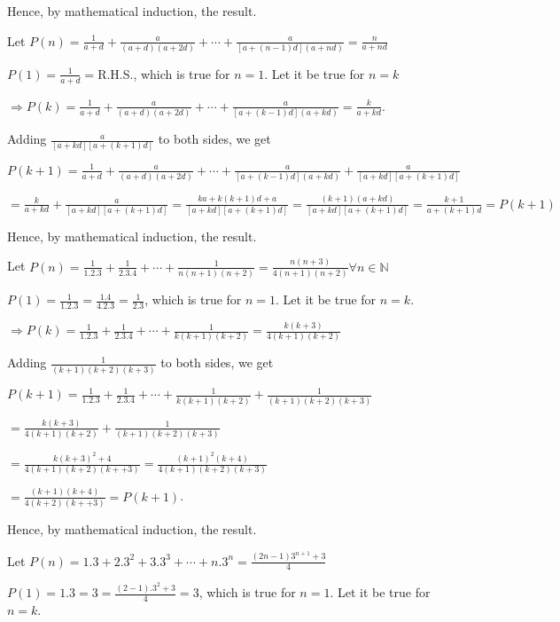   Hence, by mathematical induction, the result.
\item Let $P(n) = \frac{1}{a + d} + \frac{a}{(a + d)(a + 2d)} + \cdots + \frac{a}{[a + (n - 1)d](a + nd)} =
  \frac{n}{a + nd}$

  $P(1) = \frac{1}{a + d} = $R.H.S., which is true for $n = 1$. Let it be true for $n = k$

  $\Rightarrow P(k) = \frac{1}{a + d} + \frac{a}{(a + d)(a + 2d)} + \cdots + \frac{a}{[a + (k - 1)d](a +
    kd)} = \frac{k}{a + kd}$.

  Adding $\frac{a}{[a + kd][a + (k + 1)d]}$ to both sides, we get

  $P(k + 1) = \frac{1}{a + d} + \frac{a}{(a + d)(a + 2d)} + \cdots + \frac{a}{[a + (k - 1)d](a +
    kd)} + \frac{a}{[a + kd][a + (k + 1)d]}$

  $= \frac{k}{a + kd} + \frac{a}{[a + kd][a + (k + 1)d]} = \frac{ka
  + k(k + 1)d + a}{[a + kd][a + (k + 1)d]} = \frac{(k + 1)(a + kd)}{[a + kd][a + (k + 1)d]} = \frac{k + 1}{a
  + (k + 1)d} = P(k + 1)$

  Hence, by mathematical induction, the result.
\item Let $P(n) = \frac{1}{1.2.3} + \frac{1}{2.3.4} + \cdots + \frac{1}{n(n + 1)(n + 2)} = \frac{n(n +
  3)}{4(n + 1)(n + 2)}\forall n\in \mathbb{N}$

  $P(1) = \frac{1}{1.2.3} = \frac{1.4}{4.2.3} = \frac{1}{2.3}$, which is true for $n = 1$. Let it be true
  for $n = k$.

  $\Rightarrow P(k) = \frac{1}{1.2.3} + \frac{1}{2.3.4} + \cdots + \frac{1}{k(k + 1)(k + 2)} = \frac{k(k +
    3)}{4(k + 1)(k + 2)}$

  Adding $\frac{1}{(k + 1)(k + 2)(k + 3)}$ to both sides, we get

  $P(k + 1) = \frac{1}{1.2.3} + \frac{1}{2.3.4} + \cdots + \frac{1}{k(k + 1)(k + 2)} + \frac{1}{(k + 1)(k +
    2)(k + 3)}$

  $= \frac{k(k + 3)}{4(k + 1)(k + 2)} + \frac{1}{(k + 1)(k + 2)(k + 3)}$

  $= \frac{k(k + 3)^2 + 4}{4(k + 1)(k + 2)(k ++ 3)} = \frac{(k + 1)^2(k + 4)}{4(k + 1)(k + 2)(k + 3)}$

  $= \frac{(k + 1)(k + 4)}{4(k + 2)(k ++ 3)} = P(k + 1)$.

  Hence, by mathematical induction, the result.
\item Let $P(n) = 1.3 + 2.3^2 + 3.3^3 + \cdots + n.3^n = \frac{(2n - 1)3^{n + 1} + 3}{4}$

  $P(1) = 1.3 = 3 = \frac{(2 - 1).3^2 + 3}{4} = 3$, which is true for $n = 1$. Let it be true for $n = k$.

